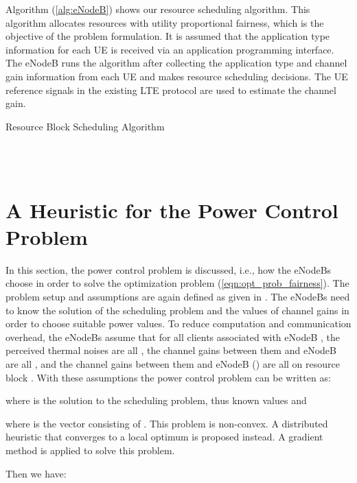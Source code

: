 \documentclass[journal]{IEEEtran} 				\IEEEoverridecommandlockouts 	\usepackage{amsmath,amssymb}
\begin{document}
Algorithm (\ref{alg:eNodeB}) shows our resource scheduling algorithm. This algorithm allocates resources with utility proportional fairness, which is the objective of the problem formulation. It is assumed that the application type information for each UE is received via an application programming interface. The eNodeB runs the algorithm after collecting the application type and channel gain information from each UE and makes resource scheduling decisions. The UE reference signals in the existing LTE protocol are used to estimate the channel gain.   

\begin{algorithm}
\caption{Resource Block Scheduling Algorithm}\label{alg:eNodeB}
\begin{algorithmic}
\STATE {; }
\FOR {}
	\IF {} 
	\STATE {} \\
	\STATE {} \\
\ENDIF 
\ENDFOR
\end{algorithmic}
\end{algorithm}

\section{A Heuristic for the Power Control Problem}\label{sec:power_control}
In this section, the power control problem is discussed, i.e., how the eNodeBs choose  in order to solve the optimization problem (\ref{eqn:opt_prob_fairness}). The problem setup and assumptions are again defined as given in \cite{SelfOrganizedLTE}. The eNodeBs need to know the solution of the scheduling problem  and the values of channel gains  in order to choose suitable power values. To reduce computation and communication overhead, the eNodeBs assume that for all clients  associated with eNodeB , the perceived thermal noises are all , the channel gains between them and eNodeB  are all , and the channel gains between them and eNodeB  () are all   on resource block . With these assumptions the power control problem can be written as:

where  is the solution to the scheduling problem, thus known values and 

where  is the vector consisting of .
This problem is non-convex. A distributed heuristic that converges to a local optimum is proposed instead. A gradient method is applied to solve this problem. 

Then we have:	
\end{document}
